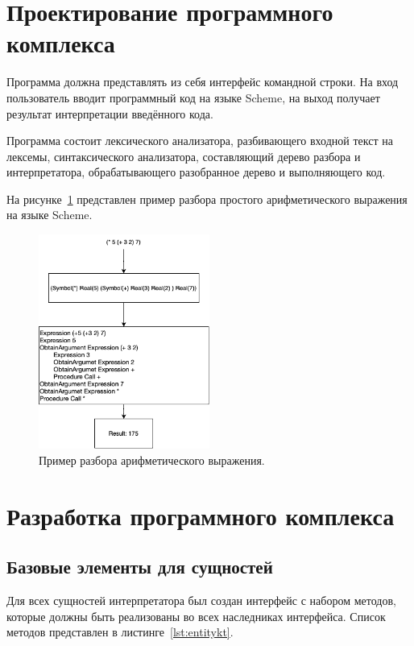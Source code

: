 \documentclass[14pt, russian]{scrartcl}
\begin{document}
\section{Проектирование программного комплекса}

Программа должна представлять из себя интерфейс командной строки.
На вход пользователь вводит программный код на языке Scheme, на выход получает результат интерпретации введённого кода.

Программа состоит лексического анализатора, разбивающего входной текст на лексемы, синтаксического анализатора, составляющий дерево разбора и интерпретатора, обрабатывающего разобранное дерево и выполняющего код.

На рисунке~\ref{fig::parse} представлен пример разбора простого арифметического выражения на языке Scheme.


\begin{figure}[!htb]\centering
\includegraphics[width=0.5\textwidth]{parse.png}
\caption{Пример разбора арифметического выражения.}
\label{fig::parse}
\end{figure}

\section{Разработка программного комплекса}

\subsection{Базовые элементы для сущностей}

Для всех сущностей интерпретатора был создан интерфейс с набором методов, которые должны быть реализованы во всех наследниках интерфейса.
Список методов представлен в листинге~\ref{lst:entitykt}.
\end{document}
